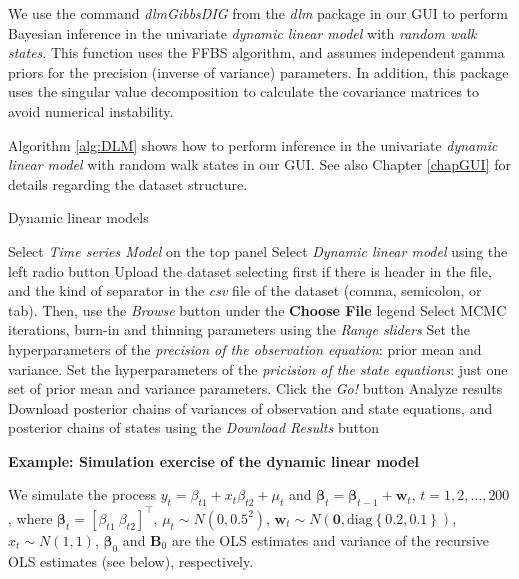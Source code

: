 We use the command \textit{dlmGibbsDIG} from the \textit{dlm} package in our GUI to perform Bayesian inference in the univariate \textit{dynamic linear model} with \textit{random walk states}. This function uses the FFBS algorithm, and assumes independent gamma priors for the precision (inverse of variance) parameters. In addition, this package uses the singular value decomposition to calculate the covariance matrices to avoid numerical instability.

Algorithm \ref{alg:DLM} shows how to perform inference in the univariate \textit{dynamic linear model} with random walk states in our GUI. See also Chapter \ref{chapGUI} for details regarding the dataset structure.

\begin{algorithm}[h!]
	\caption{Dynamic linear models}\label{alg:DLM}
	\begin{algorithmic}[1]  		 			
		\State Select \textit{Time series Model} on the top panel
		\State Select \textit{Dynamic linear model} using the left radio button
		\State Upload the dataset selecting first if there is header in the file, and the kind of separator in the \textit{csv} file of the dataset (comma, semicolon, or tab). Then, use the \textit{Browse} button under the \textbf{Choose File} legend
		\State Select MCMC iterations, burn-in and thinning parameters using the \textit{Range sliders}
		\State Set the hyperparameters of the \textit{precision of the observation equation}: prior mean and variance.
		\State Set the hyperparameters of the \textit{pricision of the state equations}: just one set of prior mean and variance parameters.
		\State Click the \textit{Go!} button
		\State Analyze results
		\State Download posterior chains of variances of observation and state equations, and posterior chains of states using the \textit{Download Results} button
	\end{algorithmic} 
\end{algorithm}

\textbf{Example: Simulation exercise of the dynamic linear model}

We simulate the process $y_t=\beta_{t1}+{x}_t{\beta}_{t2}+\mu_t$ and $\bm{\beta}_t=\bm{\beta}_{t-1}+\bm{w}_t$, $t=1,2,\dots,200$, where $\bm{\beta}_t=[\beta_{t1} \ {\beta}_{t2}]^{\top}$, $\mu_t\sim N(0,0.5^2)$, $\bm{w}_t\sim N(\bm{0},\text{diag}\left\{0.2,0.1\right\})$, $x_t\sim N(1, 1)$, $\bm{\beta}_0$ and $\bm{B}_0$ are the OLS estimates and variance of the recursive OLS estimates (see below), respectively.

